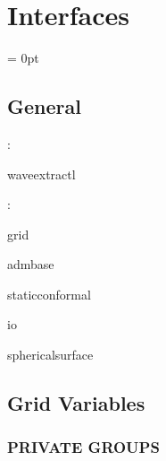 
\section{Interfaces} 


\parskip = 0pt

\vspace{3mm} \subsection*{General}

: 

waveextractl
\vspace{2mm}

: 

grid

admbase

staticconformal

io

sphericalsurface
\vspace{2mm}
\subsection*{Grid Variables}
\vspace{5mm}\subsubsection{PRIVATE GROUPS}

\vspace{5mm}

